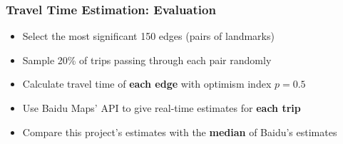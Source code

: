 \documentclass{beamer}
\theoremstyle{definition}
\begin{document}
\begin{frame}
\frametitle{Travel Time Estimation: Evaluation}
\begin{itemize}
	\item <2-> Select the most significant 150 edges (pairs of landmarks)
	\item <3-> Sample 20\% of trips passing through each pair randomly
	\item <4-> Calculate travel time of \textbf{each edge} with optimism index $p = 0.5$
	\item <5-> Use Baidu Maps' API to give real-time estimates for \textbf{each trip}
	\item <6-> Compare this project's estimates with the \textbf{median} of Baidu's estimates
\end{itemize}
\end{frame}
\end{document}
